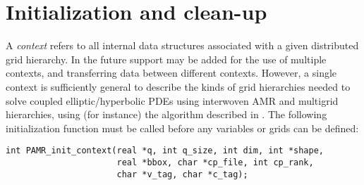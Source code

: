 \documentclass[aps,amssymb,unsortedaddress,nofootinbib]{revtex4}
\begin{document}
\section{Initialization and clean-up}
A {\em context} refers to all internal data structures associated with a given
distributed grid hierarchy. In the future support may be added for the use
of multiple contexts, and transferring data between different contexts. However,
a single context is sufficiently general to describe the kinds of grid 
hierarchies needed to solve coupled elliptic/hyperbolic PDEs using interwoven
AMR and multigrid hierarchies, using (for instance) the algorithm described in \cite{fpthesis}.
The following initialization function must be called before any variables or
grids can be defined:


\begin{verbatim}
int PAMR_init_context(real *q, int q_size, int dim, int *shape, 
                      real *bbox, char *cp_file, int cp_rank,
                      char *v_tag, char *c_tag);
\end{verbatim}
\end{document}
